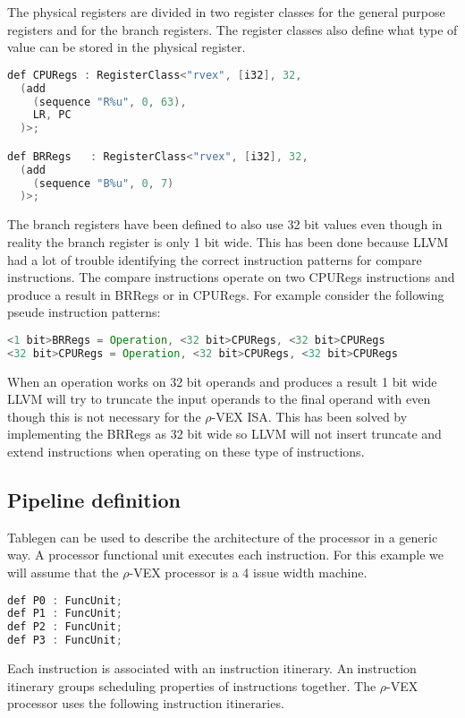 The physical registers are divided in two register classes for the general purpose registers and for the branch registers. The register classes also define what type of value can be stored in the physical register.

\begin{lstlisting}[language=java]
def CPURegs : RegisterClass<"rvex", [i32], 32, 
  (add
    (sequence "R%u", 0, 63),
    LR, PC
  )>;

def BRRegs   : RegisterClass<"rvex", [i32], 32, 
  (add 
    (sequence "B%u", 0, 7)
  )>;
\end{lstlisting}

The branch registers have been defined to also use 32 bit values even though in reality the branch register is only 1 bit wide. This has been done because LLVM had a lot of trouble identifying the correct instruction patterns for compare instructions. The compare instructions operate on two CPURegs instructions and produce a result in BRRegs or in CPURegs. For example consider the following pseude instruction patterns:

\begin{lstlisting}[language=java] 
<1 bit>BRRegs = Operation, <32 bit>CPURegs, <32 bit>CPURegs
<32 bit>CPURegs = Operation, <32 bit>CPURegs, <32 bit>CPURegs
\end{lstlisting}

When an operation works on 32 bit operands and produces a result 1 bit wide LLVM will try to truncate the input operands to the final operand with even though this is not necessary for the $\rho$-VEX ISA. This has been solved by implementing the BRRegs as 32 bit wide so LLVM will not insert truncate and extend instructions when operating on these type of instructions.

\subsection{Pipeline definition}
Tablegen can be used to describe the architecture of the processor in a generic way. A processor functional unit executes each instruction. For this example we will assume that the $\rho$-VEX processor is a 4 issue width machine.

\begin{lstlisting}[language=java] 
def P0 : FuncUnit;
def P1 : FuncUnit;
def P2 : FuncUnit;
def P3 : FuncUnit;
\end{lstlisting}

Each instruction is associated with an instruction itinerary. An instruction itinerary groups scheduling properties of instructions together. The $\rho$-VEX processor uses the following instruction itineraries.

